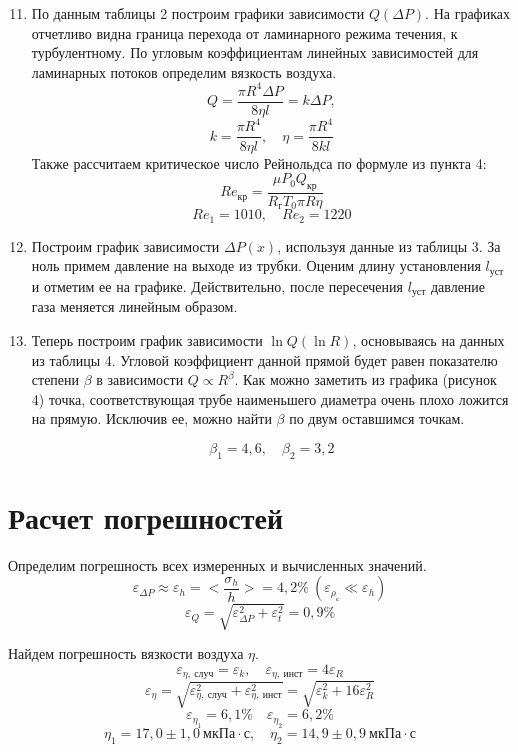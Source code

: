 \documentclass[14pt, a4paper]{report}
\begin{document}
\begin{enumerate}

\setcounter{enumi}{10}

\item По данным таблицы 2 построим графики зависимости $Q(\Delta P)$. На графиках отчетливо видна граница перехода от ламинарного режима течения, к турбулентному. По угловым коэффициентам линейных зависимостей для ламинарных потоков определим вязкость воздуха.
\[Q=\frac{\pi R^4\Delta P}{8\eta l}=k\Delta P,\]
\[k=\frac{\pi R^4}{8\eta l},\quad \eta=\frac{\pi R^4}{8kl}\]
Также рассчитаем критическое число Рейнольдса по формуле из пункта 4:
\[Re_{кр}=\frac{\mu P_0Q_{кр}}{R_гT_0\pi R\eta}\]
\[Re_1=1010,\quad Re_2=1220\]

\item Построим график зависимости $\Delta P(x)$, используя данные из таблицы 3. За ноль примем давление на выходе из трубки. Оценим длину установления $l_{уст}$ и отметим ее на графике. Действительно, после пересечения $l_{уст}$ давление газа меняется линейным образом.

\item Теперь построим график зависимости $\ln Q(\ln R)$, основываясь на данных из таблицы 4. Угловой коэффициент данной прямой будет равен показателю степени $\beta$ в зависимости $Q\propto R^\beta$. Как можно заметить из графика (рисунок 4) точка, соответствующая трубе наименьшего диаметра очень плохо ложится на прямую. Исключив ее, можно найти $\beta$ по двум оставшимся точкам.

\[\beta_1=4,6,\quad \beta_2=3,2\]

\end{enumerate}

\section{Расчет погрешностей}

Определим погрешность всех измеренных и вычисленных значений.
\[\varepsilon_{\Delta P}\approx\varepsilon_h=<\frac{\sigma_h}{h}>=4,2\%\ (\varepsilon_{\rho_с}\ll\varepsilon_h)\]
\[\varepsilon_Q=\sqrt{\varepsilon_{\Delta P}^2+\varepsilon_{t}^2}=0,9\%\]

Найдем погрешность вязкости воздуха $\eta$.
\[\varepsilon_{\eta,\ случ}=\varepsilon_{k}, \quad \varepsilon_{\eta,\ инст}=4\varepsilon_R\]
\[\varepsilon_{\eta}=\sqrt{\varepsilon_{\eta,\ случ}^2 + \varepsilon_{\eta,\ инст}^2}=\sqrt{\varepsilon_{k}^2 + 16\varepsilon_R^2}\]
\[\varepsilon_{\eta_1}=6,1\%\quad\varepsilon_{\eta_2}=6,2\%\]
\[\eta_1=17,0\pm1,0\ мкПа\cdot с,\quad\eta_2=14,9\pm0,9\ мкПа\cdot с\]
\end{document}

